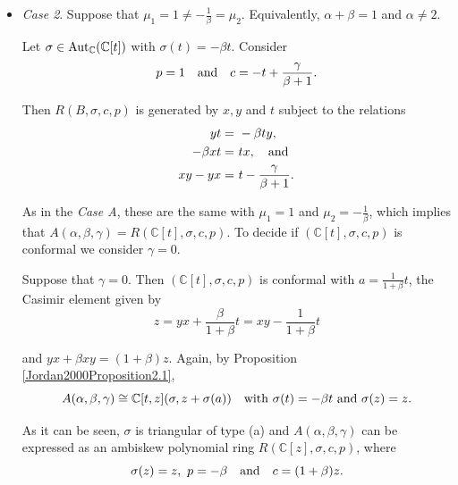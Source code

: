 \documentclass{amsart}
\theoremstyle{definition}
\theoremstyle{remark}
\numberwithin{equation}{section}
\begin{document}
\begin{itemize}
and hence 
$$
z = yx - \frac{1}{\mu_2 - \mu_1} t - \frac{\gamma \mu_1 \mu_2}{(1 - \mu_1) (1 - \mu_2)}
$$

is a Casimir element. By Proposition \ref{Jordan2000Proposition2.1}, 
$$
A(\alpha, \beta, \gamma) \cong \Bbbk[t, z](\sigma, z + \sigma(a)) \quad {\rm where} \, \, \sigma(t) = \mu_2^{-1}t \ \  {\rm and} \ \ \sigma(z) = \mu_1^{-1}z.
$$

$A(\alpha, \beta, \gamma)$ has also a second presentation as an ambiskew polynomial ring given by 
$$
R(\mathbb{C}[z], \sigma, c, \mu_2), \quad {\rm where} \, \, \sigma(z) = \mu_1^{-1}z \ \ {\rm and} \ \ c = z + \frac{\mu_1 \mu_2 \gamma}{1 - \mu_1}.
$$

\item {\em Case 2}. Suppose that $\mu_1 = 1 \neq -\frac{1}{\beta} = \mu_2$. Equivalently, $\alpha + \beta = 1$ and $\alpha \neq 2$.

Let $\sigma\in {\rm Aut}_{\mathbb{C}}(\mathbb{C}[t])$ with $\sigma(t) = -\beta t$. Consider 
$$
p = 1 \quad {\rm and} \quad c = -t + \frac{\gamma}{\beta + 1}.
$$

Then $R(B, \sigma, c, p)$ is generated by $x, y$ and $t$ subject to the relations
\begin{align}
    yt = &\ -\beta ty, \label{Jordan2000(14a)} \\
    -\beta xt = &\ tx, \quad {\rm and} \label{Jordan2000(14b)} \\
    xy - yx = &\ t - \frac{\gamma}{\beta + 1}. \label{Jordan2000(14c)}
\end{align}

As in the {\em Case A}, these are the same with $\mu_1 = 1$ and $\mu_2 = -\frac{1}{\beta}$, which implies that $A(\alpha, \beta, \gamma) = R(\mathbb{C}[t], \sigma, c, p)$. To decide if $(\mathbb{C}[t], \sigma, c, p)$ is conformal we consider $\gamma = 0$. 

Suppose that $\gamma = 0$. Then $(\mathbb{C}[t], \sigma, c, p)$ is conformal with $a = \frac{1}{1 + \beta} t$, the Casimir element given by
$$
z = yx + \frac{\beta}{1 + \beta} t = xy - \frac{1}{1 + \beta}t
$$ 

and $yx + \beta xy = (1 + \beta)z$. Again, by Proposition \ref{Jordan2000Proposition2.1}, 
$$
A(\alpha, \beta, \gamma) \cong \mathbb{C}[t, z](\sigma, z + \sigma(a)) \quad {\rm with} \, \, \sigma(t) = -\beta t \, \, {\rm and} \, \, \sigma(z) = z.
$$

As it can be seen, $\sigma$ is triangular of type (a) and $A(\alpha, \beta, \gamma)$ can be expressed as an ambiskew polynomial ring $R(\mathbb{C}[z], \sigma, c, p)$, where
\begin{equation}
    \sigma(z) = z, \, \, p = -\beta \quad {\rm and} \quad c = (1 + \beta)z.
\end{equation}


\end{itemize}
\end{document}
